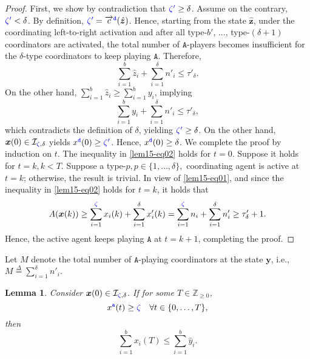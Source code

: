 \documentclass[10 pt,twocolumn,journal]{IEEEtran}
\theoremstyle{plain}
\newtheorem{lemma}{Lemma}
\newcommand{\db}{\overset{\Delta}{=}}
\newcommand{\A}{\mathcal{A}}
\newcommand{\I}{\mathcal{I}}
\newcommand{\x}{\bm{x}}
\newcommand{\y}{\bm{y}}
\newcommand{\z}{\bm{z}}
\renewcommand{\r}{\tb{\zeta}}
\newcommand{\rr}{\tb{\zeta'}}
\renewcommand{\d}{{\delta}}
\newcommand{\n}{\tb{\mathtt{a}}}
\newcommand{\nn}{\tb{\mathtt{d}}}
\renewcommand{\A}{\mathtt{A}}
\newcommand{\tb}{\textcolor{blue}}
\theoremstyle{definition}
\begin{document}
\begin{proof}
    First, we show by contradiction that $\rr \geq \d$.
    Assume on the contrary, $\rr < \d$.
    By definition, $\rr = \overrightarrow{c}^{\nn}(\hat{\z})$.
    Hence, starting from the state $\hat{\z}$, under the coordinating left-to-right activation and after all type-$b'$, ..., type-$(\delta+1)$ coordinators are activated,
    the total number of $\A$-players becomes insufficient for the $\delta$-type coordinators to keep playing $\A$. 
    Therefore,
    \begin{equation*}
        \sum_{i = 1}^{b} \hat{z}_i + \sum_{i=1}^{\d} n'_i
        \leq \tau'_{\d}.
    \end{equation*}
    On the other hand, $ \sum_{i = 1}^{b} \hat{z}_i \geq  \sum_{i = 1}^{b} y_i$, implying  
    \begin{equation*}
        \sum_{i = 1}^{b} y_i + \sum_{i=1}^{\d} n'_i
        \leq \tau'_{\d},
    \end{equation*}  
    which contradicts the definition of $\d$, yielding $\rr \geq \d$.
    On the other hand, $\x(0)\in\I_{\r,\d}$ yields $x^{\nn}(0) \geq \rr$.
    Hence, $x^{\nn}(0) \geq \d$. 
    We complete the proof by induction on $t$. 
    The inequality in \eqref{lem15-eq02} holds for $t = 0$. 
    Suppose it holds for $t = k, k<T$.
    Suppose a type-$p, p\in\{1,\ldots, \d\},$ coordinating agent is active at $t=k$; otherwise, the result is trivial. 
    In view of \eqref{lem15-eq01}, and since the inequality in \eqref{lem15-eq02} holds for $t = k$, it holds that
    \begin{equation*}
        A(\x(k))
        \geq
        \sum_{i=1}^{\r} x_i(k) + \sum_{i=1}^{\d} x'_i(k)
        = \sum_{i=1}^{\r} n_i + \sum_{i=1}^{\d} n'_i 
        \geq \tau'_{\d} + 1.
    \end{equation*}
    Hence, the active agent keeps playing $\A$ at $t=k+1$, completing the proof.
\end{proof}
%
Let $M$ denote the total number of $\A$-playing coordinators at the state $\y$, i.e., 
$
    M \db \sum_{i = 1}^{\d}n'_i.
$
%
\begin{lemma}   \label{lem2}
    Consider $\x(0)\in\I_{\r,\d}$.
    If for some $T\in\mathbb{Z}_{\geq0}$,  
    \begin{equation}   \label{lem2-eq01}
        x^{\n}(t) \geq \r \quad \forall t\in\{0,\ldots, T\},
    \end{equation}
    then  
    \begin{equation*}
         \sum_{i=1}^b x_i(T) \leq \sum_{i=1}^b\hat{y}_i. 
    \end{equation*}
\end{lemma}
\end{document}
